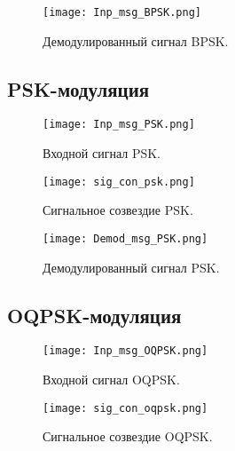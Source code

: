 \begin{figure}[H]
	\begin{center}
		\texttt{[image: Inp\_msg\_BPSK.png]}
		\caption{Демодулированный сигнал BPSK.} %
		\label{Inp_msg_BPSK} %
	\end{center}
\end{figure}

\subsection{PSK-модуляция}

\begin{figure}[H]
	\begin{center}
		\texttt{[image: Inp\_msg\_PSK.png]}
		\caption{Входной сигнал PSK.} %
		\label{Inp_msg_PSK} %
	\end{center}
\end{figure}
 
\begin{figure}[H]
	\begin{center}
		\texttt{[image: sig\_con\_psk.png]}
		\caption{Сигнальное созвездие PSK.}
		\label{sig_con_psk}
	\end{center}
\end{figure}

\begin{figure}[H]
	\begin{center}
		\texttt{[image: Demod\_msg\_PSK.png]}
		\caption{Демодулированный сигнал PSK.} %
		\label{Demod_msg_PSK} %
	\end{center}
\end{figure}

\subsection{OQPSK-модуляция}

\begin{figure}[H]
	\begin{center}
		\texttt{[image: Inp\_msg\_OQPSK.png]}
		\caption{Входной сигнал OQPSK.} %
		\label{Inp_msg_OQPSK} %
	\end{center}
\end{figure}

\begin{figure}[H]
	\begin{center}
		\texttt{[image: sig\_con\_oqpsk.png]}
		\caption{Сигнальное созвездие OQPSK.} %
		\label{sig_con_oqpsk} %
	\end{center}
\end{figure}

